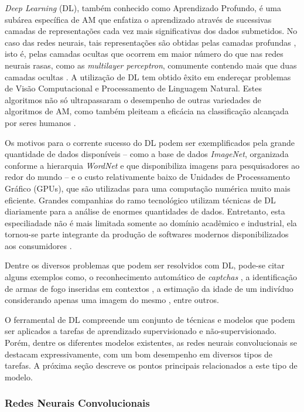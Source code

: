 
\emph{Deep Learning} (DL), também conhecido como Aprendizado Profundo, é uma subárea específica de AM que enfatiza o aprendizado através de sucessivas camadas de representações cada vez mais significativas dos dados submetidos. No caso das redes neurais, tais representações são obtidas pelas camadas profundas \cite{chollet}, isto é, pelas camadas ocultas que ocorrem em maior número do que nas redes neurais rasas, como as \emph{multilayer perceptron}, comumente contendo mais que duas camadas ocultas \cite{heaton}. A utilização de DL tem obtido êxito em endereçar problemas de Visão Computacional e Processamento de Linguagem Natural. Estes algoritmos não só ultrapassaram o desempenho de outras variedades de algoritmos de AM, como também pleiteam a eficácia na classificação alcançada por seres humanos \cite{buduma}.

Os motivos para o corrente sucesso do DL podem ser exemplificados pela grande quantidade de dados disponíveis -- como a base de dados \emph{ImageNet}, organizada conforme a hierarquia \emph{WordNet} e que disponibiliza imagens para pesquisadores ao redor do mundo \cite{imagenet} -- e o custo relativamente baixo de Unidades de Processamento Gráfico (GPUs), que são utilizadas para uma computação numérica muito mais eficiente. Grandes companhias do ramo tecnológico utilizam técnicas de DL diariamente para a análise de enormes quantidades de dados. Entretanto, esta especiliadade não é mais limitada somente ao domínio acadêmico e industrial, ela tornou-se parte integrante da produção de softwares modernos disponibilizados aos consumidores \cite{gulli}.

Dentre os diversos problemas que podem ser resolvidos com DL, pode-se citar alguns exemplos como, o reconhecimento automático de \emph{captchas} \cite{sergio-tcc}, a identificação de armas de fogo inseridas em contextos \cite{janderson-tcc}, a estimação da idade de um indivíduo considerando apenas uma imagem do mesmo \cite{nicoli-tcc}, entre outros.

O ferramental de DL compreende um conjunto de técnicas e modelos que podem ser aplicados a tarefas de aprendizado supervisionado e não-supervisionado. Porém, dentre os diferentes modelos existentes, as redes neurais convolucionais se destacam expressivamente, com um bom desempenho em diversos tipos de tarefas. A próxima seção descreve os pontos principais relacionados a este tipo de modelo.

\subsubsection{Redes Neurais Convolucionais}
\label{subsubsec:cnns}

